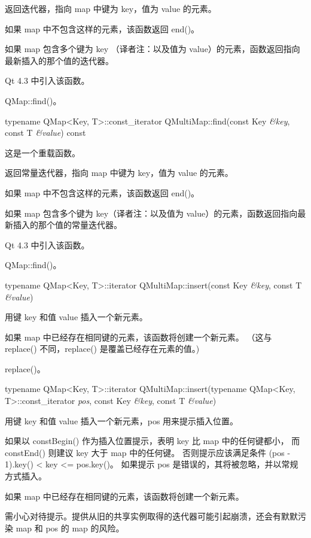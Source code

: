 返回迭代器，指向 map 中键为 key，值为 value 的元素。

如果 map 中不包含这样的元素，该函数返回 end()。

如果 map 包含多个键为 key （译者注：以及值为 value）的元素，函数返回指向最新插入的那个值的迭代器。

Qt 4.3 中引入该函数。

\begin{seeAlso}
QMap::find()。
\end{seeAlso}

typename QMap<Key, T>::const\_iterator QMultiMap::find(const Key \emph{\&key}, const T \emph{\&value}) const

这是一个重载函数。

返回常量迭代器，指向 map 中键为 key，值为 value 的元素。

如果 map 中不包含这样的元素，该函数返回 end()。

如果 map 包含多个键为 key（译者注：以及值为 value）的元素，函数返回指向最新插入的那个值的常量迭代器。

Qt 4.3 中引入该函数。

\begin{seeAlso}
QMap::find()。
\end{seeAlso}

typename QMap<Key, T>::iterator QMultiMap::insert(const Key \emph{\&key}, const T \emph{\&value})

用键 key 和值 value 插入一个新元素。

如果 map 中已经存在相同键的元素，该函数将创建一个新元素。
（这与 replace() 不同，replace() 是覆盖已经存在元素的值。)

\begin{seeAlso}
replace()。
\end{seeAlso}

typename QMap<Key, T>::iterator QMultiMap::insert(typename QMap<Key, T>::const\_iterator \emph{pos}, const Key \emph{\&key}, const T \emph{\&value})

用键 key 和值 value 插入一个新元素，pos 用来提示插入位置。

如果以 constBegin() 作为插入位置提示，表明 key 比 map 中的任何键都小，
而 constEnd() 则建议 key 大于 map 中的任何键。
否则提示应该满足条件 (pos - 1).key() < key <= pos.key()。
如果提示 pos 是错误的，其将被忽略，并以常规方式插入。

如果 map 中已经存在相同键的元素，该函数将创建一个新元素。

\begin{notice}
需小心对待提示。提供从旧的共享实例取得的迭代器可能引起崩溃，还会有默默污染 map 和 pos 的 map 的风险。
\end{notice}

